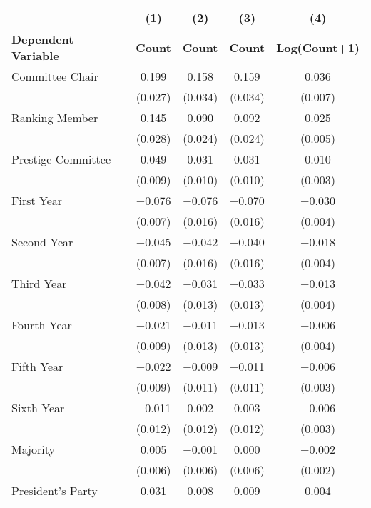 \begin{tabular}[t]{lcccc}
\toprule
  & (1) & (2) & (3) & (4)\\
\midrule
\textbf{Dependent Variable} & \textbf{Count} & \textbf{Count} & \textbf{Count} & \textbf{Log(Count+1)}\\
\midrule
Committee Chair & \num{0.199} & \num{0.158} & \num{0.159} & \num{0.036}\\
 & (\num{0.027}) & (\num{0.034}) & (\num{0.034}) & (\num{0.007})\\
Ranking Member & \num{0.145} & \num{0.090} & \num{0.092} & \num{0.025}\\
 & (\num{0.028}) & (\num{0.024}) & (\num{0.024}) & (\num{0.005})\\
Prestige Committee & \num{0.049} & \num{0.031} & \num{0.031} & \num{0.010}\\
 & (\num{0.009}) & (\num{0.010}) & (\num{0.010}) & (\num{0.003})\\
First Year & \num{-0.076} & \num{-0.076} & \num{-0.070} & \num{-0.030}\\
 & (\num{0.007}) & (\num{0.016}) & (\num{0.016}) & \vphantom{1} (\num{0.004})\\
Second Year & \num{-0.045} & \num{-0.042} & \num{-0.040} & \num{-0.018}\\
 & (\num{0.007}) & (\num{0.016}) & (\num{0.016}) & (\num{0.004})\\
Third Year & \num{-0.042} & \num{-0.031} & \num{-0.033} & \num{-0.013}\\
 & (\num{0.008}) & (\num{0.013}) & (\num{0.013}) & (\num{0.004})\\
Fourth Year & \num{-0.021} & \num{-0.011} & \num{-0.013} & \num{-0.006}\\
 & (\num{0.009}) & (\num{0.013}) & (\num{0.013}) & (\num{0.004})\\
Fifth Year & \num{-0.022} & \num{-0.009} & \num{-0.011} & \num{-0.006}\\
 & (\num{0.009}) & (\num{0.011}) & (\num{0.011}) & (\num{0.003})\\
Sixth Year & \num{-0.011} & \num{0.002} & \num{0.003} & \num{-0.006}\\
 & (\num{0.012}) & (\num{0.012}) & (\num{0.012}) & (\num{0.003})\\
Majority & \num{0.005} & \num{-0.001} & \num{0.000} & \num{-0.002}\\
 & (\num{0.006}) & (\num{0.006}) & (\num{0.006}) & (\num{0.002})\\
President's Party & \num{0.031} & \num{0.008} & \num{0.009} & \num{0.004}\\

\end{tabular}
